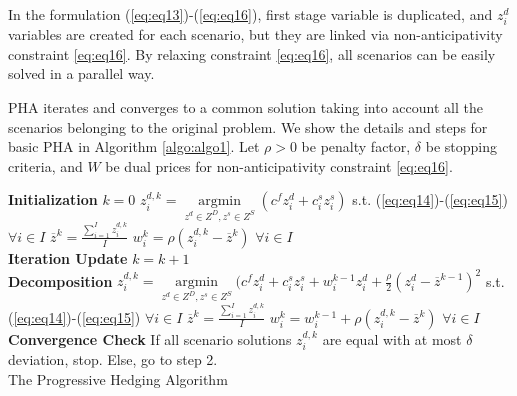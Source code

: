 \documentclass[12pt]{article}
\DeclareMathOperator*{\argmin}{argmin}
\begin{document}
In the formulation  (\ref{eq:eq13})-(\ref{eq:eq16}), first stage variable is duplicated, and $z^d_i$ variables are created for each scenario, but they are linked via non-anticipativity constraint \ref{eq:eq16}. By relaxing constraint \ref{eq:eq16}, all scenarios can be easily solved in a parallel way. 

PHA iterates and converges to a common solution taking into account all the scenarios belonging to the original problem. We show the details and steps for basic PHA in Algorithm \ref{algo:algo1}. Let $\rho>0$ be penalty factor, $\delta$ be stopping criteria, and $W$ be dual prices for non-anticipativity constraint \ref{eq:eq16}.\\
\begin{algorithm}
\textbf{Initialization} \linebreak
\linebreak
$k=0$ \linebreak
\linebreak
$z^{d,k}_i=\argmin\limits_{z^d \in Z^D,z^s \in Z^S}(c^fz^d_i+c_i^sz_i^s)$ \quad s.t. (\ref{eq:eq14})-(\ref{eq:eq15})\hspace{5 mm} $\forall i \in I$ \linebreak
\linebreak
$\overline{z}^k=\frac{\sum\limits_{i=1}^{I}z^{d,k}_i}{I}$ \linebreak
\linebreak
$w_i^k=\rho(z^{d,k}_i-\overline{z}^k)$  \hspace{5 mm} $\forall i \in I$ \linebreak
\\
\textbf{Iteration Update}\linebreak
\linebreak
$k=k+1$\linebreak
\\
\textbf{Decomposition}\linebreak
\linebreak
$z^{d,k}_i=\argmin\limits_{z^d \in Z^D,z^s \in Z^S}(c^fz^d_i+c_i^sz_i^s+w_i^{k-1}z^d_i+\frac{\rho}{2}(z^d_i-\overline{z}^{k-1})^2$ \quad s.t. (\ref{eq:eq14})-(\ref{eq:eq15}) \hspace{5 mm} $\forall i \in I$ \linebreak
\linebreak
$\overline{z}^k=\frac{\sum\limits_{i=1}^{I}z^{d,k}_i}{I}$ \linebreak
\linebreak
$w_i^k=w_i^{k-1}+\rho(z^{d,k}_i-\overline{z}^k)$  \hspace{5 mm} $\forall i \in I$ \linebreak
\\
\textbf{Convergence Check}\linebreak
\linebreak
If all scenario solutions $z^{d,k}_i$ are equal with at most $\delta$ deviation, stop. Else, go to step 2.\linebreak
\\
\caption{The Progressive Hedging Algorithm}
\label{algo:algo1}
\end{algorithm}
\end{document}
